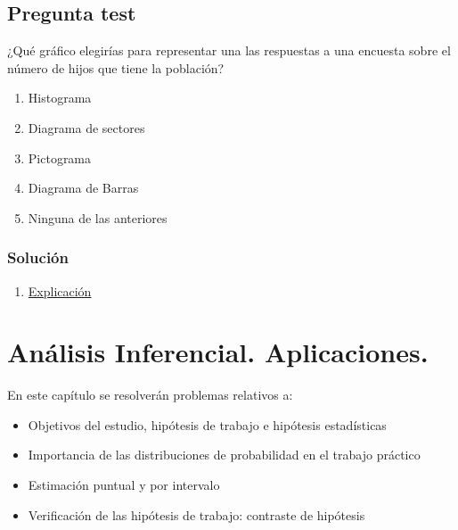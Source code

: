 \documentclass[
]{book}
\providecommand{\tightlist}{%
  \setlength{\itemsep}{0pt}\setlength{\parskip}{0pt}}
\begin{document}
\hypertarget{pregunta-test-25}{%
\section{Pregunta test}\label{pregunta-test-25}}

¿Qué gráfico elegirías para representar una las respuestas a una encuesta sobre el número de hijos que tiene la población?

\begin{enumerate}
\def\labelenumi{\alph{enumi})}
\tightlist
\item
  Histograma
\item
  Diagrama de sectores
\item
  Pictograma
\item
  Diagrama de Barras
\item
  Ninguna de las anteriores
\end{enumerate}

\hypertarget{soluciuxf3n-24}{%
\subsection{Solución}\label{soluciuxf3n-24}}

\begin{enumerate}
\def\labelenumi{\alph{enumi})}
\setcounter{enumi}{3}
\tightlist
\item
  \href{https://1fjmanzano.github.io/bioestadistica/diagramas-de-barras-y-sectores.html}{Explicación}
\end{enumerate}

\hypertarget{anuxe1lisis-inferencial.-aplicaciones.}{%
\chapter{Análisis Inferencial. Aplicaciones.}\label{anuxe1lisis-inferencial.-aplicaciones.}}

En este capítulo se resolverán problemas relativos a:

\begin{itemize}
\tightlist
\item
  Objetivos del estudio, hipótesis de trabajo e hipótesis estadísticas
\item
  Importancia de las distribuciones de probabilidad en el trabajo práctico
\item
  Estimación puntual y por intervalo
\item
  Verificación de las hipótesis de trabajo: contraste de hipótesis
\end{itemize}
\end{document}
